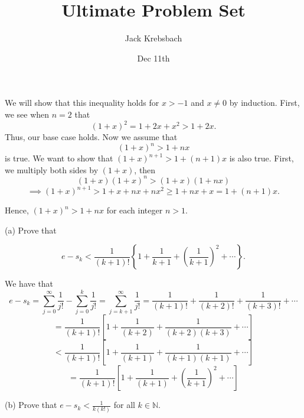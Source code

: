 \documentclass{report}
\title{Ultimate Problem Set}
\author{Jack Krebsbach }
\date{Dec 11th}
\begin{document}
\maketitle




\begin{myproof}
We will show that this inequality holds for $x>-1$ and $x\not= 0$ by induction. First, we see when $n=2$ that $$ (1+x)^2 = 1 +2x + x^2 > 1+2x.$$ Thus, our base case holds. Now we assume that $$ (1+x)^n > 1 +nx$$ is true. We want to show that
$ (1+x)^{n+1} > 1 +(n+1)x$
is also true. First, we multiply both sides by $(1+x)$, then $$(1+x)(1+x)^n > (1+x)(1+nx)$$
$$ \implies (1+x)^{n+1} > 1 + x + nx + nx^2 \geq 1 + nx + x = 1 + (n+1)x.$$

Hence, $(1+x)^n>1+n x$ for each integer $n>1$.

\end{myproof}

\pagebreak
{}

(a) Prove that

$$
e-s_k<\frac{1}{(k+1) !}\left\{1+\frac{1}{k+1}+\left(\frac{1}{k+1}\right)^2+\cdots\right\} .
$$

\begin{myproof}
    
We have that
$$ e-s_k = \sum_{j=0}^{\infty} \frac{1}{j !} - \sum_{j=0}^k \frac{1}{j !} = \sum_{j=k+1}^{\infty} \frac{1}{j !} = \frac{1}{(k+1)!} +\frac{1}{(k+2)!}+ \frac{1}{(k+3)!} + \cdots$$ $$= \frac{1}{(k+1)!}\left[1 + \frac{1}{(k+2)}  + \frac{1}{(k+2)(k+3)} + \cdots \right]$$
$$< \frac{1}{(k+1)!}\left[1 + \frac{1}{(k+1)}  + \frac{1}{(k+1)(k+1)} + \cdots \right]$$
$$= \frac{1}{(k+1)!}\left[1 + \frac{1}{(k+1)}  + \left(\frac{1}{k+1}\right)^2 + \cdots \right]$$
\bigskip
\end{myproof}
\bigskip
(b) Prove that $e-s_k<\frac{1}{k(k!)}$ for all $k \in \mathbb{N}$.
\end{document}
